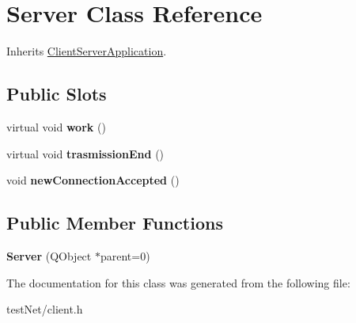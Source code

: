 \hypertarget{class_server}{\section{Server Class Reference}
\label{class_server}
}


Inherits \hyperlink{class_client_server_application}{Client\-Server\-Application}.

\subsection*{Public Slots}
\begin{DoxyCompactItemize}
\item 
\hypertarget{class_server_a921d801498e3fa3cf02f2ff8e0725e69}{virtual void {\bfseries work} ()}\label{class_server_a921d801498e3fa3cf02f2ff8e0725e69}

\item 
\hypertarget{class_server_a7ed66fab76ec1c3ce4aecb030d274b27}{virtual void {\bfseries trasmission\-End} ()}\label{class_server_a7ed66fab76ec1c3ce4aecb030d274b27}

\item 
\hypertarget{class_server_af3c3f5d6a89f25bf169ab2a9aa506f5c}{void {\bfseries new\-Connection\-Accepted} ()}\label{class_server_af3c3f5d6a89f25bf169ab2a9aa506f5c}

\end{DoxyCompactItemize}
\subsection*{Public Member Functions}
\begin{DoxyCompactItemize}
\item 
\hypertarget{class_server_a1950ac036d86af898428d7ba39bbf048}{{\bfseries Server} (Q\-Object $\ast$parent=0)}\label{class_server_a1950ac036d86af898428d7ba39bbf048}

\end{DoxyCompactItemize}


The documentation for this class was generated from the following file\-:\begin{DoxyCompactItemize}
\item 
test\-Net/client.\-h\end{DoxyCompactItemize}
